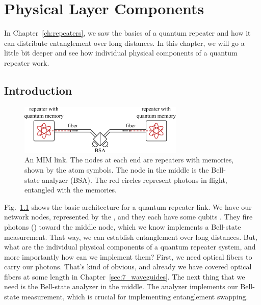 
\chapter{Physical Layer Components}

In Chapter~\ref{ch:repeaters}, we saw the basics of a quantum repeater and how it can distribute entanglement over long distances. In this chapter, we will go a little bit deeper and see how individual physical components of a quantum repeater work.

\section{Introduction}

\begin{figure}[t]
    \centering
    \includegraphics[width=0.7\textwidth]{lesson13/13-1_repeater.pdf}
    \caption[MIM link hardware]{An MIM link. The nodes at each end are repeaters with memories, shown by the atom symbols.  The node in the middle is the Bell-state analyzer (BSA).  The red circles represent photons in flight, entangled with the memories.}
    \label{fig:13-MIM-link}
\end{figure}


Fig.~\ref{fig:13-MIM-link} shows the basic architecture for a quantum repeater link. We have our network nodes, represented by the , and they each have some qubits .  They fire photons () toward the middle node, which we know implements a Bell-state measurement. That way, we can establish entanglement over long distances. But, what are the individual physical components of a quantum repeater system, and more importantly how can we implement them? First, we need optical fibers to carry our photons. That's kind of obvious, and already we have covered optical fibers at some length in Chapter~\ref{sec:7_waveguides}. The next thing that we need is the Bell-state analyzer in the middle. The analyzer implements our Bell-state measurement, which is crucial for implementing entanglement swapping.

